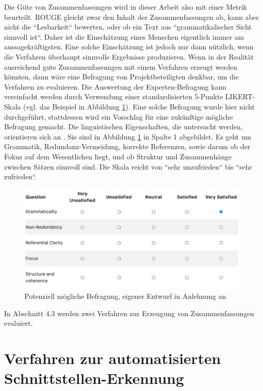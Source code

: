 Die Güte von Zusammenfassungen wird in dieser Arbeit also mit einer Metrik beurteilt. ROUGE gleicht zwar den Inhalt der Zusammenfassungen ab, kann aber nicht die ``Lesbarkeit`` bewerten, oder ob ein Text aus ``grammatikalischer Sicht sinnvoll ist``. Daher ist die Einschätzung eines Menschen eigentlich immer am aussagekräftigsten. Eine solche Einschätzung ist jedoch nur dann nützlich, wenn die Verfahren überhaupt sinnvolle Ergebnisse produzieren. Wenn in der Realität ausreichend gute Zusammenfassungen mit einem Verfahren erzeugt werden könnten, dann wäre eine Befragung von Projektbeteiligten denkbar, um die Verfahren zu evaluieren. Die Auswertung der Experten-Befragung kann vereinfacht werden durch Verwendung einer standardisierten 5-Punkte LIKERT-Skala (vgl. das Beispiel in Abbildung \ref{Abbildung:Dang}). Eine solche Befragung wurde hier nicht durchgeführt, stattdessen wird ein Vorschlag für eine zukünftige mögliche Befragung gemacht. Die linguistischen Eigenschaften, die untersucht werden, orientieren sich an \cite{Dang}. Sie sind in Abbildung \ref{Abbildung:Dang} in Spalte 1 abgebildet. Es geht um Grammatik, Redundanz-Vermeidung, korrekte Referenzen, sowie darum ob der Fokus auf dem Wesentlichen liegt, und ob Struktur und Zusammenhänge zwischen Sätzen sinnvoll sind. Die Skala reicht von ``sehr unzufrieden`` bis ``sehr zufrieden``. 
 
\begin{figure}[h]
\centering
\includegraphics[scale=0.9]{content/pics/Picture_9.png}
\caption{ Potenziell mögliche Befragung, eigener Entwurf in Anlehnung an \cite{Dang}}
\label{Abbildung:Dang}
\end{figure}

In Abschnitt 4.3 werden zwei Verfahren zur Erzeugung von Zusammenfassungen evaluiert.


\section{Verfahren zur automatisierten Schnittstellen-Erkennung}

